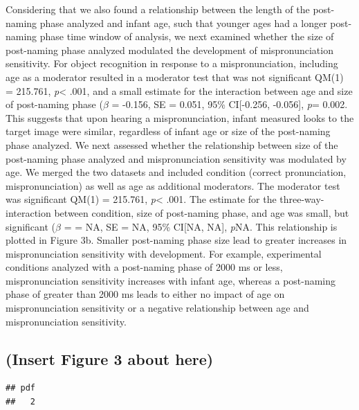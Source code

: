 \documentclass[man]{apa6}
\theoremstyle{definition}
\theoremstyle{definition}
\theoremstyle{definition}
\theoremstyle{remark}
\begin{document}
Considering that we also found a relationship between the length of the
post-naming phase analyzed and infant age, such that younger ages had a
longer post-naming phase time window of analysis, we next examined
whether the size of post-naming phase analyzed modulated the development
of mispronunciation sensitivity. For object recognition in response to a
mispronunciation, including age as a moderator resulted in a moderator
test that was not significant QM(1) = 215.761, \emph{p}\textless{} .001,
and a small estimate for the interaction between age and size of
post-naming phase (\(\beta\) = -0.156, SE = 0.051, 95\% CI{[}-0.256,
-0.056{]}, \emph{p}= 0.002. This suggests that upon hearing a
mispronunciation, infant measured looks to the target image were
similar, regardless of infant age or size of the post-naming phase
analyzed. We next assessed whether the relationship between size of the
post-naming phase analyzed and mispronunciation sensitivity was
modulated by age. We merged the two datasets and included condition
(correct pronunciation, mispronunciation) as well as age as additional
moderators. The moderator test was significant QM(1) = 215.761,
\emph{p}\textless{} .001. The estimate for the three-way-interaction
between condition, size of post-naming phase, and age was small, but
significant (\(\beta\) = = NA, SE = NA, 95\% CI{[}NA, NA{]}, \emph{p}NA.
This relationship is plotted in Figure 3b. Smaller post-naming phase
size lead to greater increases in mispronunciation sensitivity with
development. For example, experimental conditions analyzed with a
post-naming phase of 2000 ms or less, mispronunciation sensitivity
increases with infant age, whereas a post-naming phase of greater than
2000 ms leads to either no impact of age on mispronunciation sensitivity
or a negative relationship between age and mispronunciation sensitivity.

\subsection{(Insert Figure 3 about
here)}\label{insert-figure-3-about-here}

\begin{verbatim}
## pdf 
##   2
\end{verbatim}
\end{document}
